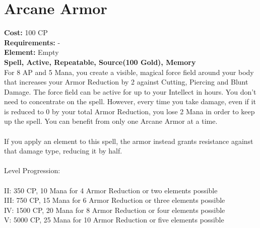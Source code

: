 \section{Arcane Armor}
\textbf{Cost:} 100 CP\\
\textbf{Requirements:} -\\
\textbf{Element:} Empty\\
\textbf{Spell, Active, Repeatable, Source(100 Gold), Memory}\\
For 8 AP and 5 Mana, you create a visible, magical force field around your body that increases your Armor Reduction by 2 against Cutting, Piercing and Blunt Damage. The force field can be active for up to your Intellect in hours. You don’t need to concentrate on the spell. However, every time you take damage, even if it is reduced to 0 by your total Armor Reduction, you lose 2 Mana in order to keep up the spell. You can benefit from only one Arcane Armor at a time.\\
\\
If you apply an element to this spell, the armor instead grants resistance against that damage type, reducing it by half.\\
\\
Level Progression:\\
\\
II: 350 CP, 10 Mana for 4 Armor Reduction or two elements possible\\
III: 750 CP, 15 Mana for 6 Armor Reduction or three elements possible\\
IV: 1500 CP, 20 Mana for 8 Armor Reduction or four elements possible\\
V: 5000 CP, 25 Mana for 10 Armor Reduction or five elements possible\\